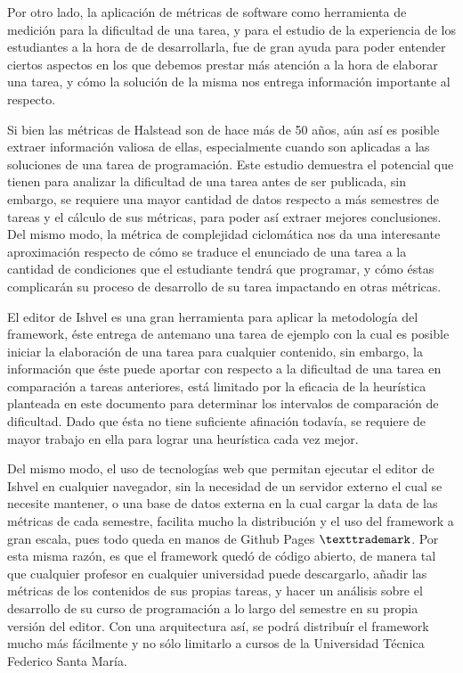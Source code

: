 \documentclass[letterpaper,12pt]{article}
\begin{document}
Por otro lado, la aplicación de métricas de software como herramienta de medición para la dificultad de una tarea, y para el estudio de la experiencia de los estudiantes a la hora de de desarrollarla, fue de gran ayuda para poder entender ciertos aspectos en los que debemos prestar más atención a la hora de elaborar una tarea, y cómo la solución de la misma nos entrega información importante al respecto.

Si bien las métricas de Halstead son de hace más de 50 años, aún así es posible extraer información valiosa de ellas, especialmente cuando son aplicadas a las soluciones de una tarea de programación. Este estudio demuestra el potencial que tienen para analizar la dificultad de una tarea antes de ser publicada, sin embargo, se requiere una mayor cantidad de datos respecto a más semestres de tareas y el cálculo de sus métricas, para poder así extraer mejores conclusiones. Del mismo modo, la métrica de complejidad ciclomática nos da una interesante aproximación respecto de cómo se traduce el enunciado de una tarea a la cantidad de condiciones que el estudiante tendrá que programar, y cómo éstas complicarán su proceso de desarrollo de su tarea impactando en otras métricas.

El editor de Ishvel es una gran herramienta para aplicar la metodología del framework, éste entrega de antemano una tarea de ejemplo con la cual es posible iniciar la elaboración de una tarea para cualquier contenido, sin embargo, la información que éste puede aportar con respecto a la dificultad de una tarea en comparación a tareas anteriores, está limitado por la eficacia de la heurística planteada en este documento para determinar los intervalos de comparación de dificultad. Dado que ésta no tiene suficiente afinación todavía, se requiere de mayor trabajo en ella para lograr una heurística cada vez mejor.

Del mismo modo, el uso de tecnologías web que permitan ejecutar el editor de Ishvel en cualquier navegador, sin la necesidad de un servidor externo el cual se necesite mantener, o una base de datos externa en la cual cargar la data de las métricas de cada semestre, facilita mucho la distribución y el uso del framework a gran escala, pues todo queda en manos de Github Pages $\texttrademark$. Por esta misma razón, es que el framework quedó de código abierto, de manera tal que cualquier profesor en cualquier universidad puede descargarlo, añadir las métricas de los contenidos de sus propias tareas, y hacer un análisis sobre el desarrollo de su curso de programación a lo largo del semestre en su propia versión del editor. Con una arquitectura así, se podrá distribuír el framework mucho más fácilmente y no sólo limitarlo a cursos de la Universidad Técnica Federico Santa María.
\end{document}
